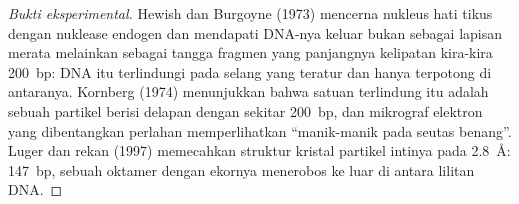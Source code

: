 \begin{proof}[Bukti eksperimental]
Hewish dan Burgoyne (1973) mencerna nukleus hati tikus dengan nuklease
endogen dan mendapati DNA-nya keluar bukan sebagai lapisan merata melainkan
sebagai tangga fragmen yang panjangnya kelipatan kira-kira \qty{200}{bp}:
DNA itu terlindungi pada selang yang teratur dan hanya terpotong di
antaranya. Kornberg (1974) menunjukkan bahwa satuan terlindung itu adalah
sebuah partikel berisi delapan  dengan sekitar \qty{200}{bp}, dan
mikrograf elektron  yang dibentangkan perlahan memperlihatkan
``manik-manik pada seutas benang''. Luger dan rekan (1997) memecahkan
struktur kristal partikel intinya pada \qty{2.8}{\angstrom}: \qty{147}{bp},
sebuah oktamer dengan ekornya menerobos ke luar di antara lilitan DNA.
\end{proof}

